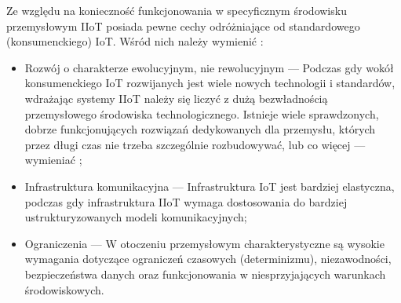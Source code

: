 \documentclass[a4paper, 12pt, twoside]{article}
\begin{document}
Ze względu na konieczność funkcjonowania w specyficznym środowisku przemysłowym
IIoT posiada pewne cechy odróżniające od standardowego (konsumenckiego) IoT.
Wśród nich należy wymienić \cite{iiot-challenges-opportunities-directions}:
\begin{itemize}
    \item Rozwój o charakterze ewolucyjnym, nie rewolucyjnym
    --- Podczas gdy wokół konsumenckiego IoT rozwijanych jest wiele nowych technologii i standardów, 
    wdrażając systemy IIoT należy się liczyć z dużą bezwładnością
    przemysłowego środowiska technologicznego. Istnieje wiele sprawdzonych, dobrze
    funkcjonujących rozwiązań dedykowanych dla przemysłu, których przez długi czas
    nie trzeba szczególnie rozbudowywać, lub co więcej --- wymieniać \cite{isp};
    \item Infrastruktura komunikacyjna 
    --- Infrastruktura IoT jest bardziej elastyczna, podczas gdy infrastruktura
    IIoT wymaga dostosowania do bardziej ustrukturyzowanych modeli komunikacyjnych;
    \item Ograniczenia
    --- W otoczeniu przemysłowym charakterystyczne są wysokie wymagania dotyczące
    ograniczeń czasowych (determinizmu), niezawodności, bezpieczeństwa danych oraz
    funkcjonowania w niesprzyjających warunkach środowiskowych.
\end{itemize}
\end{document}
